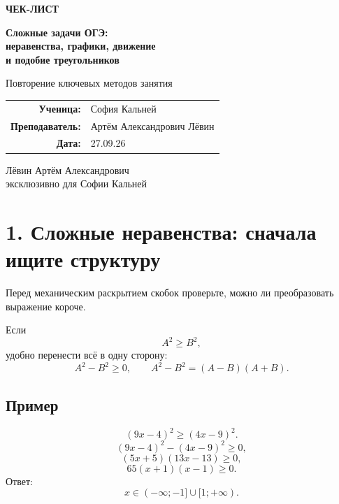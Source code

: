 \documentclass[a4paper,12pt]{article}
\newcommand{\keyidea}[1]{\medskip{\color{darkaccent}\bfseries #1}\smallskip}
\begin{document}
\begin{titlepage}
\thispagestyle{empty}
\vspace*{24mm}
\begin{center}
{\Large\color{darkaccent}\bfseries ЧЕК-ЛИСТ}

\vspace{9mm}
{\huge\bfseries Сложные задачи ОГЭ:\\[3mm]
неравенства, графики, движение\\
и подобие треугольников}

\vspace{12mm}
{\large Повторение ключевых методов занятия}

\vspace{22mm}
\begin{tabular}{rl}
\textbf{Ученица:} & София Кальней \\[3mm]
\textbf{Преподаватель:} & Артём Александрович Лёвин \\[3mm]
\textbf{Дата:} & 27.09.26
\end{tabular}

\vfill
{\large\color{darkaccent}
Лёвин Артём Александрович\\
эксклюзивно для Софии Кальней}

\vspace{18mm}
\end{center}
\end{titlepage}

\section*{\color{darkaccent}1. Сложные неравенства: сначала ищите структуру}

Перед механическим раскрытием скобок проверьте, можно ли преобразовать выражение короче.

\keyidea{Разность квадратов}

Если
\[
A^2\ge B^2,
\]
удобно перенести всё в одну сторону:
\[
A^2-B^2\ge0,
\qquad
A^2-B^2=(A-B)(A+B).
\]

\subsection*{Пример}
\[
(9x-4)^2\ge(4x-9)^2.
\]
\[
(9x-4)^2-(4x-9)^2\ge0,
\]
\[
(5x+5)(13x-13)\ge0,
\]
\[
65(x+1)(x-1)\ge0.
\]
Ответ:
\[
\boxed{x\in(-\infty;-1]\cup[1;+\infty)}.
\]
\end{document}
